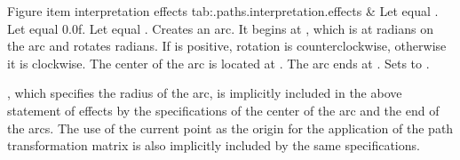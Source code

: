 \begin{libreqtab2a} {Figure item interpretation effects} {tab:\iotwod.paths.interpretation.effects}
 &
Let  equal . Let  equal {0.0f}. Let  equal . Creates an arc. It begins at , which is at  radians on the arc and rotates  radians. If  is positive, rotation is counterclockwise, otherwise it is clockwise. The center of the arc is located at . The arc ends at . Sets  to .

\begin{note} , which specifies the radius of the arc, is implicitly included in the above statement of effects by the specifications of the center of the arc and the end of the arcs. The use of the current point as the origin for the application of the path transformation matrix is also implicitly included by the same specifications. \end{note} \\
\end{libreqtab2a}
